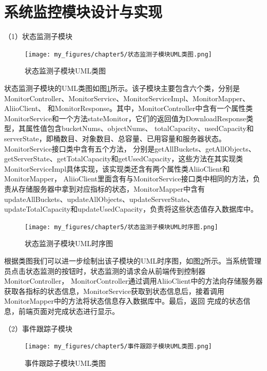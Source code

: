 \section{系统监控模块设计与实现}

（1）状态监测子模块

\begin{figure}[htb]
    \centering
    \texttt{[image: my\_figures/chapter5/状态监测子模块UML类图.png]}
    \caption{状态监测子模块UML类图}
    \label{fig:状态监测子模块UML类图}
\end{figure}

状态监测子模块的UML类图如图\ref{fig:状态监测子模块UML类图}所示。该子模块主要包含六个类，分别是MonitorController、MonitorService、MonitorServiceImpl、MonitorMapper、AliioClient、
和MonitorResponse。其中，MonitorController中含有一个属性类MonitorService和一个方法stateMonitor，它们的返回值为DownloadResponse类型，其属性值包含bucketNums、objectNums、
totalCapacity、usedCapacity和serverState，即桶数目、对象数目、总容量、已用容量和服务器状态。MonitorService接口类中含有五个方法，
分别是getAllBuckets、getAllObjects、getServerState、getTotalCapacity和getUsedCapacity，这些方法在其实现类MonitorServiceImpl具体实现，该实现类还含有两个属性类AliioClient和MonitorMapper，
AliioClient里面含有与MonitorService接口类中相同的方法，负责从存储服务器中拿到对应指标的状态，MonitorMapper中含有updateAllBuckets、updateAllObjects、updateServerState、
updateTotalCapacity和updateUsedCapacity，负责将这些状态值存入数据库中。

\begin{figure}[htb]
    \centering
    \texttt{[image: my\_figures/chapter5/状态监测子模块UML时序图.png]}
    \caption{状态监测子模块UML时序图}
    \label{fig:状态监测子模块UML时序图}
\end{figure}

根据类图我们可以进一步绘制出该子模块的UML时序图，如图\ref{fig:状态监测子模块UML时序图}所示。当系统管理员点击状态监测的按钮时，状态监测的请求会从前端传到控制器MonitorController，
MonitorController通过调用AliioClient中的方法向存储服务器获取各指标的状态信息，MonitorService获取到状态信息后，接着调用MonitorMapper中的方法将状态信息存入数据库中。最后，返回
完成的状态信息，前端页面对完成状态进行显示。



（2）事件跟踪子模块

\begin{figure}[htb]
    \centering
    \texttt{[image: my\_figures/chapter5/事件跟踪子模块UML类图.png]}
    \caption{事件跟踪子模块UML类图}
    \label{fig:事件跟踪子模块UML类图}
\end{figure}


